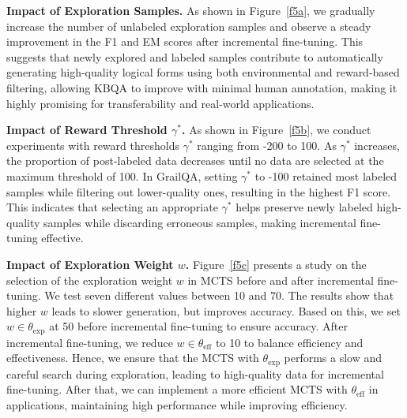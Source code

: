 \documentclass{article}
\theoremstyle{plain}
\theoremstyle{definition}
\theoremstyle{remark}
\begin{document}
\textbf{Impact of Exploration Samples. }
As shown in Figure~\ref{f5a}, we gradually increase the number of unlabeled exploration samples and observe a steady improvement in the F1 and EM scores after incremental fine-tuning. This suggests that newly explored and labeled samples contribute to automatically generating high-quality logical forms using both environmental and reward-based filtering, allowing KBQA to improve with minimal human annotation, making it highly promising for transferability and real-world applications.

\textbf{Impact of Reward Threshold $\gamma^*$. }
As shown in Figure~\ref{f5b}, we conduct experiments with reward thresholds $\gamma^*$ ranging from -200 to 100. As $\gamma^*$ increases, the proportion of post-labeled data decreases until no data are selected at the maximum threshold of 100. In GrailQA, setting $\gamma^*$ to -100 retained most labeled samples while filtering out lower-quality ones, resulting in the highest F1 score. This indicates that selecting an appropriate $\gamma^*$ helps preserve newly labeled high-quality samples while discarding erroneous samples, making incremental fine-tuning effective.

\textbf{Impact of Exploration Weight $w$. }
Figure~\ref{f5c} presents a study on the selection of the exploration weight $w$ in MCTS before and after incremental fine-tuning. We test seven different values between 10 and 70. The results show that higher $w$ leads to slower generation, but improves accuracy. Based on this, we set $w\in\theta_{\text{exp}}$ at 50 before incremental fine-tuning to ensure accuracy. After incremental fine-tuning, we reduce $w\in\theta_{\text{eff}}$ to 10 to balance efficiency and effectiveness.
Hence, we ensure that the MCTS with $\theta_{\text{exp}}$ performs a slow and careful search during exploration, leading to high-quality data for incremental fine-tuning. After that, we can implement a more efficient MCTS with $\theta_{\text{eff}}$ in applications, maintaining high performance while improving efficiency.

\end{document}

